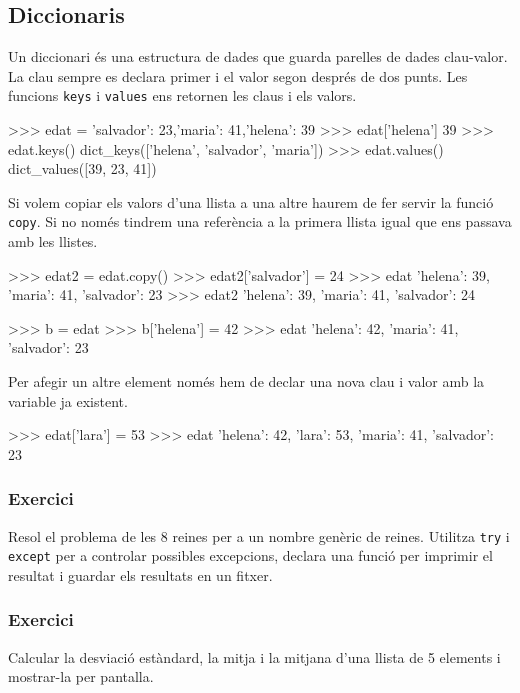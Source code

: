 \subsection{Diccionaris}

Un diccionari és una estructura de dades que guarda parelles de dades clau-valor. La clau sempre es declara primer i el valor segon després de dos punts. Les funcions {\tt keys} i {\tt values} ens retornen les claus i els valors.

\begin{tip}[caption=Operacions amb dicionaris]
>>> edat = {'salvador': 23,'maria': 41,'helena': 39}
>>> edat['helena']
39
>>> edat.keys()
dict_keys(['helena', 'salvador', 'maria'])
>>> edat.values()
dict_values([39, 23, 41])
\end{tip}


Si volem copiar els valors d'una llista a una altre haurem de fer servir la funció {\tt copy}. Si no només tindrem una referència a la primera llista igual que ens passava amb les llistes.

\begin{blockcode}
>>> edat2 = edat.copy()
>>> edat2['salvador'] = 24
>>> edat
{'helena': 39, 'maria': 41, 'salvador': 23}
>>> edat2
{'helena': 39, 'maria': 41, 'salvador': 24}
\end{blockcode}  


\begin{blockcode}
>>> b = edat
>>> b['helena'] = 42
>>> edat
{'helena': 42, 'maria': 41, 'salvador': 23}
\end{blockcode}

Per afegir un altre element només hem de declar una nova clau i valor amb la variable ja existent.

\begin{blockcode}
>>> edat['lara'] = 53
>>> edat
{'helena': 42, 'lara': 53, 'maria': 41, 'salvador': 23}
\end{blockcode}

\subsubsection*{Exercici } 

Resol el problema de les 8 reines per a un nombre genèric de reines. Utilitza {\tt try} i {\tt except} per a controlar possibles excepcions, declara una funció per imprimir el resultat i guardar els resultats en un fitxer.




\subsubsection*{Exercici } 


Calcular la desviació estàndard, la mitja i la mitjana d'una llista de 5 elements i mostrar-la per pantalla.



